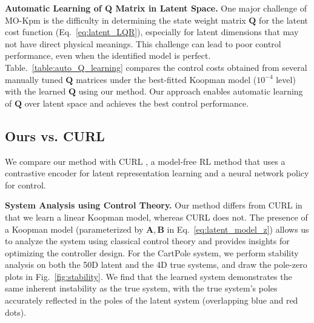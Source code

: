 \documentclass{article}
\begin{document}
\textbf{Automatic Learning of $\mathbf{Q}$ Matrix in Latent Space.}
One major challenge of MO-Kpm is the difficulty in determining the state weight matrix $\mathbf{Q}$ for the latent cost function (Eq.~\eqref{eq:latent_LQR}), especially for latent dimensions that may not have direct physical meanings. This challenge can lead to poor control performance, even when the identified model is perfect.
%
Table.~\ref{table:auto_Q_learning} compares the control costs obtained from several manually tuned $\mathbf{Q}$ matrices under the best-fitted Koopman model ($10^{-4}$ level) with the learned $\mathbf{Q}$ using our method. Our approach enables automatic learning of $\mathbf{Q}$ over latent space and achieves the best control performance.

\subsection{Ours vs. CURL}
We compare our method with CURL \cite{laskin2020curl}, a model-free RL method that uses a contrastive encoder for latent representation learning and a neural network policy for control. 

\textbf{System Analysis using Control Theory.}
Our method differs from CURL in that we learn a linear Koopman model, whereas CURL does not. The presence of a Koopman model (parameterized by $\mathbf{A, B}$ in Eq.~\ref{eq:latent_model_z}) allows us to analyze the system using classical control theory and provides insights for optimizing the controller design.
%
For the CartPole system, we perform stability analysis on both the 50D latent and the  4D true systems, and draw the pole-zero plots in Fig.~\ref{fig:stability}. 
We find that the learned system demonstrates the same inherent instability as the true system, with the true system's poles accurately reflected in the poles of the latent system (overlapping blue and red dots). 
\end{document}
